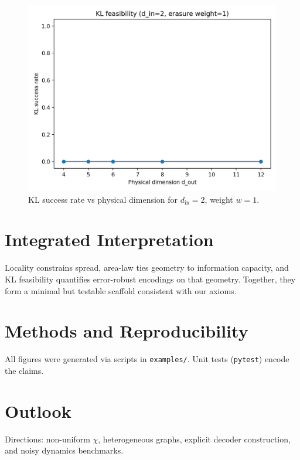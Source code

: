 \documentclass[11pt]{article}
\begin{document}
\begin{figure}[h]
  \centering
  \includegraphics[width=.7\textwidth]{../outputs/figs/kl_success_din2_w1.png}
  \caption{KL success rate vs physical dimension for $d_{\text{in}}=2$, weight $w=1$.}
  \label{fig:kl}
\end{figure}

\section{Integrated Interpretation}
Locality constrains spread, area-law ties geometry to information capacity, and KL feasibility quantifies error-robust encodings on that geometry. Together, they form a minimal but testable scaffold consistent with our axioms.

\section{Methods and Reproducibility}
All figures were generated via scripts in \texttt{examples/}. Unit tests (\texttt{pytest}) encode the claims.

\section{Outlook}
Directions: non-uniform $\chi$, heterogeneous graphs, explicit decoder construction, and noisy dynamics benchmarks.



\end{document}
